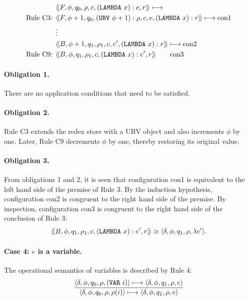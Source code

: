 
\begin{align*}
&\langle\!\langle F,\phi,q_0,\rho,c,(\THOR{LAMBDA}\ x):e,r\rangle\!\rangle
\longmapsto\\
\text{Rule C3: }&
\langle\!\langle F,\phi+1,q_0,(\THOR{UBV}\ \phi+1):\rho,c,e,(\THOR{LAMBDA}\ x):r\rangle\!\rangle
\longmapsto \mathrm{con1}\\
&\vdots\\
&\langle\!\langle B,\phi+1,q_1,\rho_1,c,e',(\THOR{LAMBDA}\ x):r\rangle\!\rangle
\longmapsto \mathrm{con2}\\
\text{Rule C9: }&
\langle\!\langle B,\phi,q_1,\rho_1,c,(\THOR{LAMBDA}\ x):e',r\rangle\!\rangle
\qquad \mathrm{con3}
\end{align*}

\paragraph{Obligation 1.} There are no application conditions that need to be
satisfied.

\paragraph{Obligation 2.} Rule C3 extends the redex store with a UBV object and
also increments \(\phi\) by one. Later, Rule C9 decrements \(\phi\) by one,
thereby restoring its original value.

\paragraph{Obligation 3.} From obligations 1 and 2, it is seen that
configuration con1 is equivalent to the left hand side of the premise of Rule
3. By the induction hypothesis, configuration con2 is congruent to the right
hand side of the premise. By inspection, configuration con3 is congruent to the
right hand side of the conclusion of Rule 3:
\[
\langle\!\langle B,\phi,q_1,\rho_1,c,(\texttt{LAMBDA}\ x):e',r\rangle\!\rangle
\simeq
\langle \delta,\phi,q_1,\rho,\lambda e'\rangle.
\]

\paragraph{Case 4: \(e\) is a variable.}
The operational semantics of variables is described by Rule 4:
\[
\frac{
  \langle \delta,\phi,q_0,\rho,(\texttt{VAR}\ i)\rangle
  \longmapsto
  \langle \delta,\phi,q_1,\rho,e\rangle
}{
  \langle \delta,\phi,q_0,\rho,\rho(i)\rangle
  \longmapsto
  \langle \delta,\phi,q_1,\rho,e\rangle
}
\]

